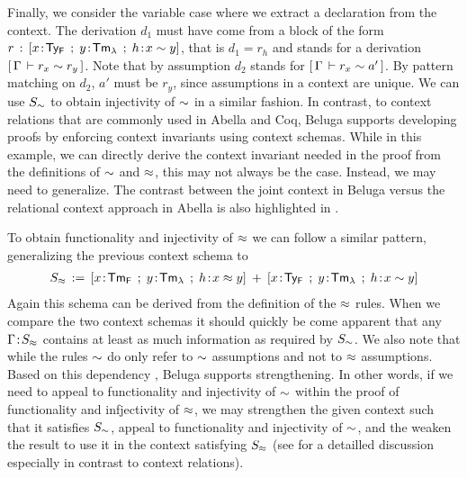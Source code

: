 

Finally, we consider the variable case where we extract a declaration from the context. The derivation $d_1$ must have come from a block of the form $r \mathrel{\, : \,} [x\!:\!\mathsf{Ty_{F}} \mathrel{\, ; \,} y\!:\!\mathsf{Tm_{\lambda}} \mathrel{\, ; \,} h \!:\! x \mathrel{\sim} y]$, that is $d_1 = r_h$ and stands for a derivation
$[\,\Gamma\,\vdash r_x \mathrel{\sim} r_y\,]$. Note that by assumption $d_2$ stands for $[\,\Gamma\,\vdash r_x \mathrel{\sim} a'\,]$.  By pattern matching on $d_2$, $a'$ must be $r_y$, since assumptions in a context are unique.
We can use $S_{\mathrel{\sim}}$ to obtain injectivity of $\mathrel{\sim}$ in a similar fashion.
%
In contrast, to context relations that are commonly used in Abella and Coq, Beluga supports developing proofs by enforcing context invariants using context schemas. While in this example, we can directly derive the context invariant needed in the proof from the definitions of $\mathrel{\sim}$ and $\mathrel{\approx}$, this may not always be the case.  Instead, we may need to generalize. The contrast between the joint context in Beluga versus the relational context approach in Abella is also highlighted in \cite{Felty:ITP10,Felty:orbi-survey}.


To obtain functionality and injectivity of $\mathrel{\approx}$ we can follow a similar pattern, generalizing the previous context schema  to 
\begin{align*}
  S_{\tmr} \eqdef [x\of\TmF \mrel{;} y\of\TmL \mrel{;} h\of x \tmr y] \mrel{+} [x\of\TyF \mrel{;} y\of\TmL \mrel{;} h\of x \tyr y]
\end{align*}
Again this schema can be derived from the definition of the $\mathrel{\approx}$ rules. 
When we compare the two context schemas it should quickly be come apparent that any $\Gamma \!:\! S_{\mathrel{\approx}}$ contains at least as much information as required by $S_{\mathrel{\sim}}$. We also note that while the rules $\mathrel{\sim}$ do only refer to $\mathrel{\sim}$ assumptions and not to $\mathrel{\approx}$ assumptions. Based on this dependency \cite{Virga99phd}, Beluga supports strengthening. In other words, if we need to appeal to functionality and injectivity of $\mathrel{\sim}$ within the proof of functionality and infjectivity of $\mathrel{\approx}$, we may strengthen the given context such that it satisfies $S_{\mathrel{\sim}}$, appeal to functionality and injectivity of $\mathrel{\sim}$, and the weaken the result to use it in the context satisfying $S_{\mathrel{\approx}}$ (see \cite{Felty:orbi-survey} for a detailled discussion especially in contrast to context relations).


